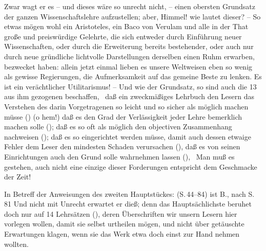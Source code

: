 Zwar wagt er es -- und dieses wäre so unrecht nicht, -- einen obersten Grundsatz der ganzen Wissenschaftslehre aufzustellen; aber, Himmel! wie lautet dieser?  -- So etwas mögen wohl ein Aristoteles, ein Baco von Verulam und alle in der That große und preiswürdige Gelehrte, die sich entweder durch Einführung neuer Wissenschaften, oder durch die Erweiterung bereits bestehender, oder auch nur durch neue gründliche lichtvolle Darstellungen derselben einen Ruhm erwarben, bezwecket haben: allein jetzt einmal lieben es unsere Weltweisen eben so wenig als gewisse Regierungen, die Aufmerksamkeit auf das gemeine Beste zu lenken. Es ist ein verächtlicher Utilitarismus! -- Und wie der Grundsatz, so sind auch die 13 aus ihm gezogenen  beschaffen, \zB\ daß ein zweckmäßiges Lehrbuch den Lesern das Verstehen des darin Vorgetragenen so leicht und so sicher als möglich machen müsse () (o hem!) daß es den Grad der Verlässigkeit jeder Lehre bemerklich machen solle (); daß es so oft als möglich den objectiven Zusammenhang nachweisen (); daß es so eingerichtet werden müsse, damit auch dessen etwaige Fehler dem Leser den mindesten Schaden verursachen (), daß es von seinen Einrichtungen auch den Grund solle wahrnehmen lassen (), \usw\ Man muß es gestehen, auch nicht eine einzige dieser Forderungen entspricht dem Geschmacke der Zeit! \par 
In Betreff der Anweisungen des zweiten Hauptstückes:  (S.\,44--84) ist B., nach S.\,81  Und nicht mit Unrecht erwartet er dieß; denn das Hauptsächlichste beruhet doch nur auf 14 Lehrsätzen (), deren Überschriften wir unsern Lesern hier vorlegen wollen, damit sie selbst urtheilen mögen, und nicht über getäuschte Erwartungen klagen, wenn sie das Werk etwa doch einst zur Hand nehmen wollten. \par 
